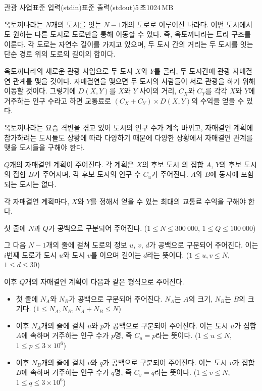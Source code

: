 \begin{problem}{관광 사업}{표준 입력(stdin)}{표준 출력(stdout)}{5\,초}{1024\,MB}

옥토끼나라는 $N$개의 도시를 잇는 $N-1$개의 도로로 이루어진 나라다. 어떤 도시에서도 원하는 다른 도시로 도로만을 통해 이동할 수 있다. 즉, 옥토끼나라는 트리 구조를 이룬다. 각 도로는 자연수 길이를 가지고 있으며, 두 도시 간의 거리는 두 도시를 잇는 단순 경로 위의 도로의 길이의 합이다.

옥토끼나라의 새로운 관광 사업으로 두 도시 $X$와 $Y$를 골라, 두 도시간에 관광 자매결연 관계를 맺을 것이다. 자매결연을 맺으면 두 도시의 사람들이 서로 관광을 하기 위해 이동할 것이다. 그렇기에 $D\left(X,Y\right)$를 $X$와 $Y$ 사이의 거리, $C_X$와 $C_Y$를 각각 $X$와 $Y$에 거주하는 인구 수라고 하면 교통료로 $\left(C_X+C_Y\right) \times D\left(X,Y\right)$의 수익을 얻을 수 있다.

옥토끼나라는 요즘 격변을 겪고 있어 도시의 인구 수가 계속 바뀌고, 자매결연 계획에 참가하려는 도시들도 상황에 따라 다양하기 때문에 다양한 상황에서 자매결연 관계를 맺을 도시들을 구해야 한다.

$Q$개의 자매결연 계획이 주어진다. 각 계획은 $X$의 후보 도시 의 집합 $A$, $Y$의 후보 도시의 집합 $B$가 주어지며, 각 후보 도시의 인구 수 $C_u$가 주어진다. $A$와 $B$에 동시에 포함되는 도시는 없다.

각 자매결연 계획마다, $X$와 $Y$를 정해서 얻을 수 있는 최대의 교통료 수익을 구해야 한다.

\InputFile
첫 줄에 $N$과 $Q$가 공백으로 구분되어 주어진다. ($1 \leq N \leq 300\ 000$, $1 \leq Q \leq 100\ 000$)

그 다음 $N-1$개의 줄에 걸쳐 도로의 정보 $u$, $v$, $d$가 공백으로 구분되어 주어진다. 이는 $i$번째 도로가 도시 $u$와 도시 $v$를 이으며 길이는 $d$라는 뜻이다. ($1 \leq u,v \leq N$, $1 \leq d \leq 30$)

이후 $Q$개의 자매결연 계획이 다음과 같은 형식으로 주어진다.
\begin{itemize}
    \item 첫 줄에 $N_A$와 $N_B$가 공백으로 구분되어 주어진다. $N_A$는 $A$의 크기, $N_B$는 $B$의 크기다. ($1 \leq N_A,N_B, N_A+N_B \leq N$)
    \item 이후 $N_A$개의 줄에 걸쳐 $u$와 $p$가 공백으로 구분되어 주어진다. 이는 도시 $u$가 집합 $A$에 속하며 거주하는 인구 수가 $p$명, 즉 $C_u=p$라는 뜻이다. ($1 \leq u \leq N$, $1 \leq p \leq 3 \times 10^6$)
    \item 이후 $N_B$개의 줄에 걸쳐 $v$와 $q$가 공백으로 구분되어 주어진다. 이는 도시 $v$가 집합 $B$에 속하며 거주하는 인구 수가 $q$명, 즉 $C_v=q$라는 뜻이다. ($1 \leq v \leq N$, $1 \leq q \leq 3 \times 10^6$)
\end{itemize}


\end{problem}
